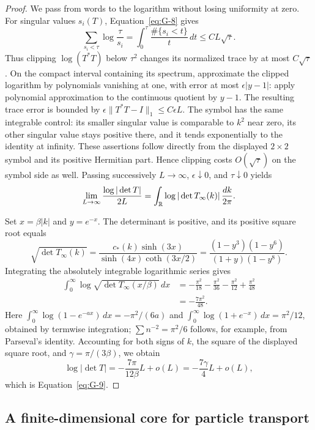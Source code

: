 \begin{proof}
We pass from words to the logarithm without losing uniformity at zero.
For singular values \(s_i(T)\), Equation~\eqref{eq:G-8} gives
\[
 \sum_{s_i<\tau}\log\frac{\tau}{s_i}
 =\int_0^\tau\frac{\#\{s_i<t\}}{t}\,dt
 \le CL\sqrt\tau.
\]
Thus clipping \(\log(T^*T)\) below \(\tau^2\) changes its normalized
trace by at most \(C\sqrt\tau\). On the compact interval containing
its spectrum, approximate the clipped logarithm by polynomials
vanishing at one, with error at most \(\epsilon|y-1|\): apply polynomial
approximation to the continuous quotient by \(y-1\).
The resulting trace error is bounded by
\(\epsilon\|T^*T-I\|_1\le C\epsilon L\).
The symbol has the same integrable control: its smaller singular value
is comparable to \(k^2\) near zero, its other singular value stays
positive there, and it tends exponentially to the identity at infinity.
These assertions follow directly from the displayed \(2\times2\)
symbol and its positive Hermitian part. Hence clipping costs
\(O(\sqrt\tau)\) on the symbol side as well. Passing successively
\(L\to\infty\), \(\epsilon\downarrow0\), and \(\tau\downarrow0\)
yields
\[
 \lim_{L\to\infty}\frac{\log|\det T|}{2L}
       =\int_{\mathbb R}\log|\det T_\infty(k)|\,\frac{dk}{2\pi}.
\]

Set \(x=\beta|k|\) and \(y=e^{-x}\). The determinant is positive,
and its positive square root equals
\[
 \sqrt{\det T_\infty(k)}
 =\frac{c_*(k)\sinh(3x)}{\sinh(4x)\coth(3x/2)}
 =\frac{(1-y^3)(1-y^6)}{(1+y)(1-y^8)}.
\]
Integrating the absolutely integrable logarithmic series gives
\[
 \begin{split}
 \int_0^\infty\log\sqrt{\det T_\infty(x/\beta)}\,dx
 &=-\frac{\pi^2}{18}-\frac{\pi^2}{36}
       -\frac{\pi^2}{12}+\frac{\pi^2}{48}\\
 &=-\frac{7\pi^2}{48}.
 \end{split}
\]
Here \(\int_0^\infty\log(1-e^{-ax})\,dx=-\pi^2/(6a)\)
and \(\int_0^\infty\log(1+e^{-x})\,dx=\pi^2/12\), obtained by
termwise integration; \(\sum n^{-2}=\pi^2/6\) follows, for example,
from Parseval's identity. Accounting for both signs of \(k\), the
square of the displayed square root, and \(\gamma=\pi/(3\beta)\),
we obtain
\[
 \log|\det T|=-\frac{7\pi}{12\beta}L+o(L)
             =-\frac{7\gamma}{4}L+o(L),
\]
which is Equation~\eqref{eq:G-9}.
\end{proof}

\subsection{A finite-dimensional core for particle transport}

